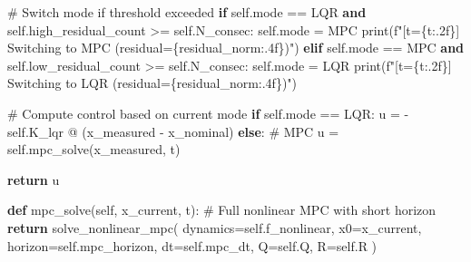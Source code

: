 \documentclass[
  letterpaper,
  DIV=11,
  numbers=noendperiod]{scrartcl}
\newenvironment{Shaded}{\begin{snugshade}}{\end{snugshade}}
\newcommand{\BuiltInTok}[1]{\textcolor[rgb]{0.00,0.23,0.31}{#1}}
\newcommand{\CommentTok}[1]{\textcolor[rgb]{0.37,0.37,0.37}{#1}}
\newcommand{\ControlFlowTok}[1]{\textcolor[rgb]{0.00,0.23,0.31}{\textbf{#1}}}
\newcommand{\KeywordTok}[1]{\textcolor[rgb]{0.00,0.23,0.31}{\textbf{#1}}}
\newcommand{\NormalTok}[1]{\textcolor[rgb]{0.00,0.23,0.31}{#1}}
\newcommand{\OperatorTok}[1]{\textcolor[rgb]{0.37,0.37,0.37}{#1}}
\newcommand{\SpecialCharTok}[1]{\textcolor[rgb]{0.37,0.37,0.37}{#1}}
\newcommand{\SpecialStringTok}[1]{\textcolor[rgb]{0.13,0.47,0.30}{#1}}
\newcommand{\StringTok}[1]{\textcolor[rgb]{0.13,0.47,0.30}{#1}}
\newcommand{\VariableTok}[1]{\textcolor[rgb]{0.07,0.07,0.07}{#1}}
\begin{document}
\begin{Shaded}
\begin{Highlighting}[]
        \CommentTok{\# Switch mode if threshold exceeded}
        \ControlFlowTok{if} \VariableTok{self}\NormalTok{.mode }\OperatorTok{==} \StringTok{\textquotesingle{}LQR\textquotesingle{}} \KeywordTok{and} \VariableTok{self}\NormalTok{.high\_residual\_count }\OperatorTok{\textgreater{}=} \VariableTok{self}\NormalTok{.N\_consec:}
            \VariableTok{self}\NormalTok{.mode }\OperatorTok{=} \StringTok{\textquotesingle{}MPC\textquotesingle{}}
            \BuiltInTok{print}\NormalTok{(}\SpecialStringTok{f"[t=}\SpecialCharTok{\{}\NormalTok{t}\SpecialCharTok{:.2f\}}\SpecialStringTok{] Switching to MPC (residual=}\SpecialCharTok{\{}\NormalTok{residual\_norm}\SpecialCharTok{:.4f\}}\SpecialStringTok{)"}\NormalTok{)}
        \ControlFlowTok{elif} \VariableTok{self}\NormalTok{.mode }\OperatorTok{==} \StringTok{\textquotesingle{}MPC\textquotesingle{}} \KeywordTok{and} \VariableTok{self}\NormalTok{.low\_residual\_count }\OperatorTok{\textgreater{}=} \VariableTok{self}\NormalTok{.N\_consec:}
            \VariableTok{self}\NormalTok{.mode }\OperatorTok{=} \StringTok{\textquotesingle{}LQR\textquotesingle{}}
            \BuiltInTok{print}\NormalTok{(}\SpecialStringTok{f"[t=}\SpecialCharTok{\{}\NormalTok{t}\SpecialCharTok{:.2f\}}\SpecialStringTok{] Switching to LQR (residual=}\SpecialCharTok{\{}\NormalTok{residual\_norm}\SpecialCharTok{:.4f\}}\SpecialStringTok{)"}\NormalTok{)}

        \CommentTok{\# Compute control based on current mode}
        \ControlFlowTok{if} \VariableTok{self}\NormalTok{.mode }\OperatorTok{==} \StringTok{\textquotesingle{}LQR\textquotesingle{}}\NormalTok{:}
\NormalTok{            u }\OperatorTok{=} \OperatorTok{{-}}\VariableTok{self}\NormalTok{.K\_lqr }\OperatorTok{@}\NormalTok{ (x\_measured }\OperatorTok{{-}}\NormalTok{ x\_nominal)}
        \ControlFlowTok{else}\NormalTok{:  }\CommentTok{\# MPC}
\NormalTok{            u }\OperatorTok{=} \VariableTok{self}\NormalTok{.mpc\_solve(x\_measured, t)}

        \ControlFlowTok{return}\NormalTok{ u}

    \KeywordTok{def}\NormalTok{ mpc\_solve(}\VariableTok{self}\NormalTok{, x\_current, t):}
        \CommentTok{\# Full nonlinear MPC with short horizon}
        \ControlFlowTok{return}\NormalTok{ solve\_nonlinear\_mpc(}
\NormalTok{            dynamics}\OperatorTok{=}\VariableTok{self}\NormalTok{.f\_nonlinear,}
\NormalTok{            x0}\OperatorTok{=}\NormalTok{x\_current,}
\NormalTok{            horizon}\OperatorTok{=}\VariableTok{self}\NormalTok{.mpc\_horizon,}
\NormalTok{            dt}\OperatorTok{=}\VariableTok{self}\NormalTok{.mpc\_dt,}
\NormalTok{            Q}\OperatorTok{=}\VariableTok{self}\NormalTok{.Q,}
\NormalTok{            R}\OperatorTok{=}\VariableTok{self}\NormalTok{.R}
\NormalTok{        )}
\end{Highlighting}
\end{Shaded}
\end{document}
